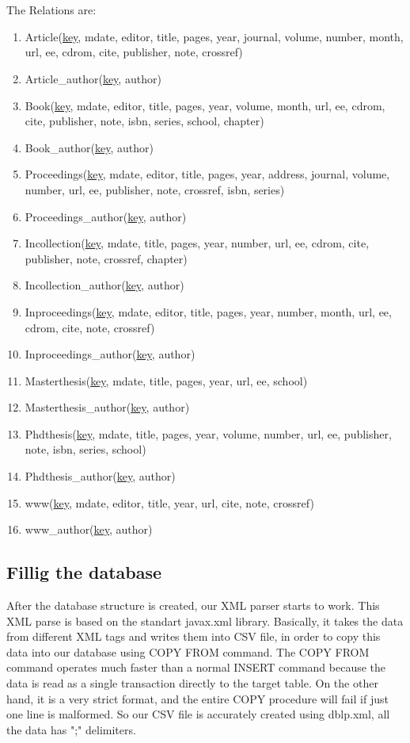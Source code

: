 \documentclass{acm_proc_article-sp}
\begin{document}
\\
\\The Relations are:
\begin{enumerate}
	\item Article(\underline{key}, mdate, editor, title, pages, year, journal, volume, number, month, url, ee, cdrom, cite, publisher, note, crossref)
	\item Article\_author(\underline{key}, author)
	\item Book(\underline{key}, mdate, editor, title, pages, year, volume, month, url, ee, cdrom, cite, publisher, note, isbn, series, school, chapter)
	\item Book\_author(\underline{key}, author)
	\item Proceedings(\underline{key}, mdate, editor, title, pages, year, address, journal, volume, number, url, ee, publisher, note, crossref, isbn, series)
	\item Proceedings\_author(\underline{key}, author)
	\item Incollection(\underline{key}, mdate, title, pages, year, number, url, ee, cdrom, cite, publisher, note, crossref, chapter)
	\item Incollection\_author(\underline{key}, author)
	\item Inproceedings(\underline{key}, mdate, editor, title, pages, year, number, month, url, ee, cdrom, cite, note, crossref)
	\item Inproceedings\_author(\underline{key}, author)
	\item Masterthesis(\underline{key}, mdate, title, pages, year, url, ee, school)
	\item Masterthesis\_author(\underline{key}, author)
	\item Phdthesis(\underline{key}, mdate, title, pages, year, volume, number, url, ee, publisher, note, isbn, series, school)
	\item Phdthesis\_author(\underline{key}, author)
	\item www(\underline{key}, mdate, editor, title, year, url, cite, note, crossref)
	\item www\_author(\underline{key}, author)
\end{enumerate}
\subsection{Fillig the database}
After the database structure is created, our XML parser starts to work. This XML parse is based on the standart javax.xml library. Basically, it takes the data from different XML tags and writes them into CSV file, in order to copy this data into our database using COPY FROM command. The COPY FROM command operates much faster than a normal INSERT command because the data is read as a single transaction directly to the target table. On the other hand, it is a very strict format, and the entire COPY procedure will fail if just one line is malformed.	So our CSV file is accurately created using dblp.xml, all the data has ";" delimiters.
\end{document}
